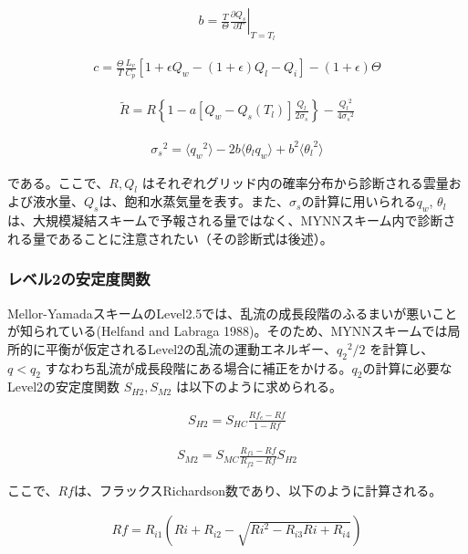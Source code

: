 \begin{eqnarray}b=\frac{T}{\Theta}\left.\frac{\partial Q_s}{\partial T}\right|_{T=T_l}\end{eqnarray}

\begin{eqnarray}c=\frac{\Theta}{T}\frac{L_v}{C_p}\left[1+\epsilon Q_w-(1+\epsilon)Q_l-Q_i\right]-(1+\epsilon)\Theta\end{eqnarray}

\begin{eqnarray}\tilde{R}=R\left\{1-a\left[Q_w-Q_s(T_l)\right]\frac{Q_l}{2\sigma_s}\right\}-\frac{{Q_l}^2}{4{\sigma_s}^2}\end{eqnarray}

\begin{eqnarray}{\sigma_s}^2=\langle {q_w}^2 \rangle -2b \langle \theta_l q_w \rangle + b^2\langle {\theta_l}^2 \rangle\end{eqnarray}

である。ここで、\(R,Q_l\)
はそれぞれグリッド内の確率分布から診断される雲量および液水量、\(Q_s\)は、飽和水蒸気量を表す。また、\(\sigma_s\)の計算に用いられる\(q_w\),
\(\theta_l\)は、大規模凝結スキームで予報される量ではなく、MYNNスキーム内で診断される量であることに注意されたい（その診断式は後述）。

\hypertarget{ux30ecux30d9ux30eb2ux306eux5b89ux5b9aux5ea6ux95a2ux6570}{%
\subsubsection{レベル2の安定度関数}\label{ux30ecux30d9ux30eb2ux306eux5b89ux5b9aux5ea6ux95a2ux6570}}

Mellor-YamadaスキームのLevel2.5では、乱流の成長段階のふるまいが悪いことが知られている(Helfand
and Labraga
1988)。そのため、MYNNスキームでは局所的に平衡が仮定されるLevel2の乱流の運動エネルギー、\({q_2}^2/2\)
を計算し、\(q<q_2\)
すなわち乱流が成長段階にある場合に補正をかける。\(q_2\)の計算に必要なLevel2の安定度関数
\(S_{H2},S_{M2}\) は以下のように求められる。

\begin{eqnarray}S_{H2}=S_{HC}\frac{Rf_c-Rf}{1-Rf}\end{eqnarray}

\begin{eqnarray}S_{M2}=S_{MC}\frac{R_{f1}-Rf}{R_{f2}-Rf}S_{H2}\end{eqnarray}

ここで、\(Rf\)は、フラックスRichardson数であり、以下のように計算される。

\begin{eqnarray}Rf=R_{i1}\left(Ri+R_{i2}-\sqrt{Ri^2-R_{i3}Ri+R_{i4}}\right)\end{eqnarray}

